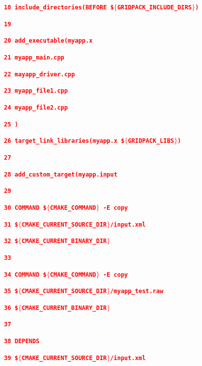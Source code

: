 \documentclass[12pt]{report} %
\begin{document}
\textcolor{red}{\texttt{\textbf{18 include\_directories(BEFORE \$$\boldsymbol{\mathrm{\{}}$GRIDPACK\_INCLUDE\_DIRS$\boldsymbol{\mathrm{\}}}$)}}}

\textcolor{red}{\texttt{\textbf{19}}}

\textcolor{red}{\texttt{\textbf{20 add\_executable(myapp.x}}}

\textcolor{red}{\texttt{\textbf{21   myapp\_main.cpp}}}

\textcolor{red}{\texttt{\textbf{22   mayapp\_driver.cpp}}}

\textcolor{red}{\texttt{\textbf{23   myapp\_file1.cpp}}}

\textcolor{red}{\texttt{\textbf{24   myapp\_file2.cpp}}}

\textcolor{red}{\texttt{\textbf{25 )}}}

\textcolor{red}{\texttt{\textbf{26 target\_link\_libraries(myapp.x \$$\boldsymbol{\mathrm{\{}}$GRIDPACK\_LIBS$\boldsymbol{\mathrm{\}}}$)}}}

\textcolor{red}{\texttt{\textbf{27 }}}

\textcolor{red}{\texttt{\textbf{28 add\_custom\_target(myapp.input}}}

\textcolor{red}{\texttt{\textbf{29 }}}

\textcolor{red}{\texttt{\textbf{30   COMMAND \$$\boldsymbol{\mathrm{\{}}$CMAKE\_COMMAND$\boldsymbol{\mathrm{\}}}$ -E copy }}}

\textcolor{red}{\texttt{\textbf{31   \$$\boldsymbol{\mathrm{\{}}$CMAKE\_CURRENT\_SOURCE\_DIR$\boldsymbol{\mathrm{\}}}$/input.xml}}}

\textcolor{red}{\texttt{\textbf{32   \$$\boldsymbol{\mathrm{\{}}$CMAKE\_CURRENT\_BINARY\_DIR$\boldsymbol{\mathrm{\}}}$}}}

\textcolor{red}{\texttt{\textbf{33 }}}

\textcolor{red}{\texttt{\textbf{34   COMMAND \$$\boldsymbol{\mathrm{\{}}$CMAKE\_COMMAND$\boldsymbol{\mathrm{\}}}$ -E copy }}}

\textcolor{red}{\texttt{\textbf{35   \$$\boldsymbol{\mathrm{\{}}$CMAKE\_CURRENT\_SOURCE\_DIR$\boldsymbol{\mathrm{\}}}$/myapp\_test.raw}}}

\textcolor{red}{\texttt{\textbf{36   \$$\boldsymbol{\mathrm{\{}}$CMAKE\_CURRENT\_BINARY\_DIR$\boldsymbol{\mathrm{\}}}$}}}

\textcolor{red}{\texttt{\textbf{37 }}}

\textcolor{red}{\texttt{\textbf{38   DEPENDS }}}

\textcolor{red}{\texttt{\textbf{39   \$$\boldsymbol{\mathrm{\{}}$CMAKE\_CURRENT\_SOURCE\_DIR$\boldsymbol{\mathrm{\}}}$/input.xml}}}
\end{document}
